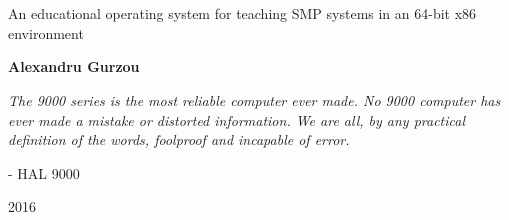 \documentclass[12pt,a4paper,twoside,openright]{report}
\begin{document}
\graphicspath{{figures/}}
\ifpdf
\else
\fi

\diplomathesis
\singlespace

\renewcommand{\thesisauthor}{Alexandru Gurzou}
\renewcommand{\thesisyear}{2016}
\renewcommand{\thesistitle}{HAL9000}
\newcommand{\projectname}{HAL9000 }

\begin{titlepage}

\thispagestyle{firststylewithoutfooter}

\begin{center}
{\scshape \facultynameenglish} \\
{\scshape \departmentnameenglish} \\

\vspace{6cm}

\thesistitlesize {\textbf{\thesistitle}\\}
\vspace {1cm}

\thesistypesize An educational operating system for teaching SMP systems
in an 64-bit x86 environment\\

\vspace{2cm}

\thesisauthortypesize \textbf{\thesisauthor} \\

\vspace{1cm}

	{
		\begin{flushright}
	  \scriptsize{\textit{The 9000 series is the most reliable computer ever made. No 9000 computer has ever made a mistake or distorted information. We are all, by any practical definition of the words, foolproof and incapable of error.}}

		- HAL 9000 \cite{2001aspaceOdyssey}
		\end{flushright}
	}
{\thesisyear} \\
\end{center}
\end{titlepage}
\end{document}
